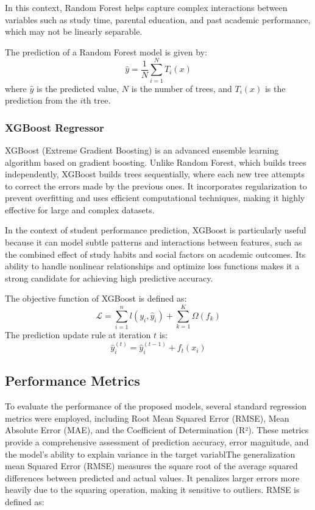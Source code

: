 \documentclass[conference]{IEEEtran}
\begin{document}
In this context, Random Forest helps capture complex interactions between variables such as study time, parental education, and past academic performance, which may not be linearly separable. 

The prediction of a Random Forest model is given by: 
\begin{equation}
\hat{y} = \frac{1}{N} \sum_{i=1}^{N} T_i(x)
\end{equation}
where $\hat{y}$ is the predicted value, $N$ is the number of trees, and $T_i(x)$ is the prediction from the $i$th tree.

\subsubsection{XGBoost Regressor}
XGBoost (Extreme Gradient Boosting) is an advanced ensemble learning algorithm based on gradient boosting. Unlike Random Forest, which builds trees independently, XGBoost builds trees sequentially, where each new tree attempts to correct the errors made by the previous ones. It incorporates regularization to prevent overfitting and uses efficient computational techniques, making it highly effective for large and complex datasets. 

In the context of student performance prediction, XGBoost is particularly useful because it can model subtle patterns and interactions between features, such as the combined effect of study habits and social factors on academic outcomes. Its ability to handle nonlinear relationships and optimize loss functions makes it a strong candidate for achieving high predictive accuracy. 

The objective function of XGBoost is defined as: 
\begin{equation}
\mathcal{L} = \sum_{i=1}^{n} l(y_i, \hat{y}_i) + \sum_{k=1}^{K} \Omega(f_k)
\end{equation}
The prediction update rule at iteration $t$ is:
\begin{equation}
\hat{y}_i^{(t)} = \hat{y}_i^{(t-1)} + f_t(x_i)
\end{equation}

\subsection{Performance Metrics}
To evaluate the performance of the proposed models, several standard regression metrics were employed, including Root Mean Squared Error (RMSE), Mean Absolute Error (MAE), and the Coefficient of Determination (R²). These metrics provide a comprehensive assessment of prediction accuracy, error magnitude, and the model’s ability to explain variance in the target variablThe generalization mean Squared Error (RMSE) measures the square root of the average squared differences between predicted and actual values. It penalizes larger errors more heavily due to the squaring operation, making it sensitive to outliers. RMSE is defined as: 
\end{document}
